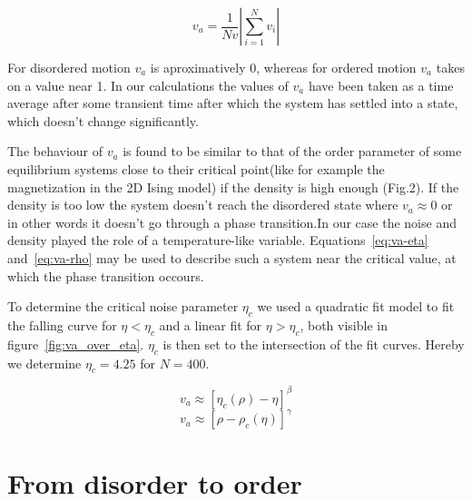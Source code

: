 \documentclass[twoside,twocolumn]{article}
\begin{document}
\begin{equation}
v_a=\frac{1}{Nv}\left\vert\sum_{i=1}^{N} v_i\right\vert
\end{equation}

For disordered motion $v_a$ is aproximatively 0, whereas for ordered motion $v_a$ takes on a value near 1.
In our calculations the values of $v_a$ have been taken as a time average after some transient time after which the system has settled into a state, which doesn't change significantly.


The behaviour of $v_a$ is found to be similar to that of the order parameter of some equilibrium systems close to their critical point(like for example the magnetization in the 2D Ising model) if the density is high enough (Fig.2).
If the density is too low the system doesn't reach the disordered state where $v_a\approx 0$ or in other words it doesn't go through a phase transition.In our case the noise and density played the role of a temperature-like variable. Equations~\eqref{eq:va-eta} and~\eqref{eq:va-rho} may be used to describe such a system near the critical value, at which the phase transition occours. 


To determine the critical noise parameter $\eta_c$ we used a quadratic fit model
to fit the falling curve for $\eta < \eta_c$ and a linear fit for $\eta > 
\eta_c$, both visible in figure~\ref{fig:va_over_eta}. $\eta_c$ is then set to 
the intersection of the fit curves. Hereby we determine $\eta_c = 4.25$ for $N=400$.


\begin{equation}
  \label{eq:va-eta}
  v_a \approx{[\eta_c(\rho)-\eta]}^\beta 
\end{equation}
\begin{equation}
  \label{eq:va-rho}
  v_a \approx{\left[\rho-\rho_c (\eta)\right]}^\gamma
\end{equation}



\section{From disorder to order}
\end{document}
